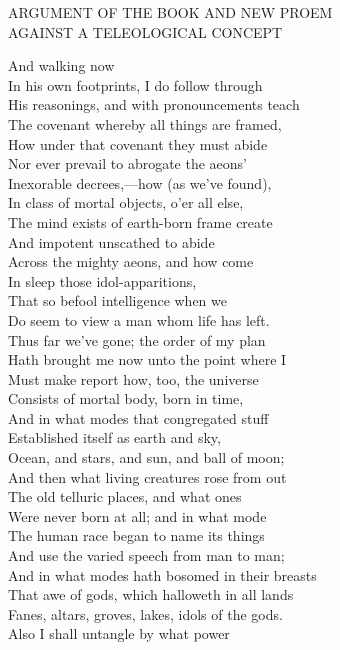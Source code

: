 ARGUMENT OF THE BOOK AND NEW PROEM\\
AGAINST A TELEOLOGICAL CONCEPT

And walking now\\
In his own footprints, I do follow through\\
His reasonings, and with pronouncements teach\\
The covenant whereby all things are framed,\\
How under that covenant they must abide\\
Nor ever prevail to abrogate the aeons'\\
Inexorable decrees,—how (as we've found),\\
In class of mortal objects, o'er all else,\\
The mind exists of earth-born frame create\\
And impotent unscathed to abide\\
Across the mighty aeons, and how come\\
In sleep those idol-apparitions,\\
That so befool intelligence when we\\
Do seem to view a man whom life has left.\\
Thus far we've gone; the order of my plan\\
Hath brought me now unto the point where I\\
Must make report how, too, the universe\\
Consists of mortal body, born in time,\\
And in what modes that congregated stuff\\
Established itself as earth and sky,\\
Ocean, and stars, and sun, and ball of moon;\\
And then what living creatures rose from out\\
The old telluric places, and what ones\\
Were never born at all; and in what mode\\
The human race began to name its things\\
And use the varied speech from man to man;\\
And in what modes hath bosomed in their breasts\\
That awe of gods, which halloweth in all lands\\
Fanes, altars, groves, lakes, idols of the gods.\\
Also I shall untangle by what power\\
